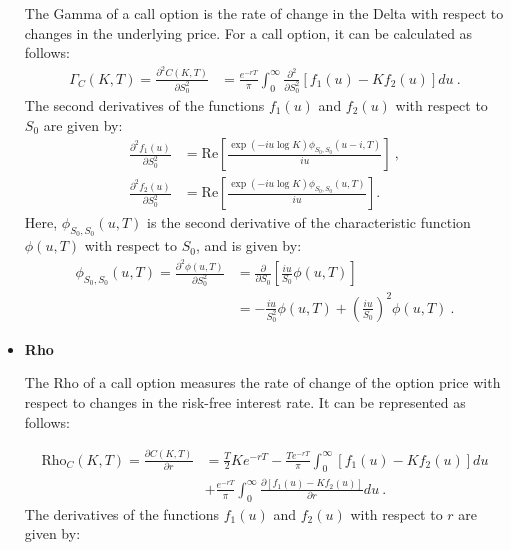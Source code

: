 \begin{itemize}
The Gamma of a call option is the rate of change in the Delta with respect to changes in the underlying price.  For a call option, it can be calculated as follows:
$$
\begin{aligned}
\Gamma_C(K,T) =
\frac{ \partial^2 C(K,T) }{\partial S_0^2} &=
 \frac{e^{-r T}}{\pi} \int_0^{\infty}\frac{ \partial^2  }{\partial S_0^2}  \left[f_1(u) - Kf_2(u)\right]du \ .
\end{aligned}
$$
The second derivatives of the functions $ f_1(u) $ and $ f_2(u) $ with respect to $ S_0 $ are given by:
\begin{equation}
\label{eq:s-derivative-s0-f1-f2}
\begin{aligned}
\frac{ \partial^2  f_1(u)   }{\partial S_0^2}&= \mathrm{Re}\left[  \frac{\exp(-iu\log K) \phi_{S_0, S_0}(u-i,T)   }{iu}\right]  \ , \\  
\frac{\partial^2  f_2(u)   }{\partial S_0^2 } &= \mathrm{Re}\left[ \frac{\exp(-iu\log K) \phi_{S_0, S_0}(u,T)  }{iu}\right].
\end{aligned}
\end{equation}
Here, $\phi_{S_0, S_0}(u,T)$ is the second derivative of the characteristic function $\phi(u,T)$ with respect to $S_0$, and is given by:
$$
\begin{aligned}
\phi_{S_0, S_0}(u,T) = \frac{ \partial^2  \phi(u,T)}{\partial S_0^2} &= \frac{\partial}{\partial S_0}  \left[ \frac{iu}{S_0} \phi(u,T)\right] \\ &= -\frac{iu}{S_0^2} \phi(u,T) + \left( \frac{iu}{S_0} \right)^2 \phi(u,T) \ .
\end{aligned}
$$




\item \textbf{Rho}

The Rho of a call option measures the rate of change of the option price with respect to changes in the risk-free interest rate. It can be represented as follows:

$$
\begin{aligned}
\text{Rho}_C(K,T) = 
\frac{ \partial C(K,T) }{\partial r} &=
\frac{T}{2} Ke^{-r T}  - \frac{T e^{-r T}} {\pi}\int_0^{\infty}\left[f_1(u) - Kf_2(u)\right]du 
\\&+ \frac{e^{-r T}} {\pi}\int_0^{\infty}\frac{ \partial \left[f_1(u) - Kf_2(u)\right]}{\partial r}   du \ .
\end{aligned}
$$
The derivatives of the functions $ f_1(u) $ and $ f_2(u) $ with respect to $ r $ are given by:


\end{itemize}
